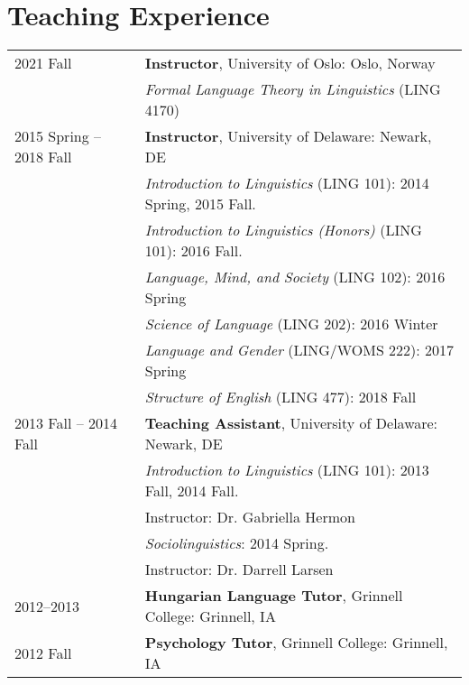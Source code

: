 \documentclass[11pt]{article} %
\begin{document}
\section*{Teaching Experience}
\begin{longtable}{p{1.6in} p{5.3in}}
	2021 Fall & \textbf{Instructor}, University of Oslo: Oslo, Norway \\
	& \textit{Formal Language Theory in Linguistics} (LING 4170)\\
	2015 Spring -- 2018 Fall & \textbf{Instructor}, University of Delaware: Newark, DE \\  
	& \textit{Introduction to Linguistics} (LING 101): 2014 Spring, 2015 Fall. 
	\\ 
	& \textit{Introduction to Linguistics (Honors)} (LING 101): 2016 Fall.\\
	& \textit{Language, Mind, and Society} (LING 102): 2016 Spring \\
	& \textit{Science of Language} (LING 202): 2016 Winter \\ 
	& \textit{Language and Gender} (LING/WOMS 222): 2017 Spring \\
	& \textit{Structure of English} (LING 477): 2018 Fall \\
	[5pt]
	2013 Fall -- 2014 Fall & \textbf{Teaching Assistant}, University of Delaware: Newark, DE \\ 
	& \textit{Introduction to Linguistics} (LING 101): 2013 Fall, 2014 Fall. \\
	& \hspace{0.2in} Instructor: Dr. Gabriella Hermon \\
	& \textit{Sociolinguistics}: 2014 Spring.\\
	& \hspace{0.2in} Instructor: Dr. Darrell Larsen \\
	[5pt]
	2012--2013 & \textbf{Hungarian Language Tutor}, Grinnell College: Grinnell, IA \\[5pt]
	2012 Fall & \textbf{Psychology Tutor}, Grinnell College: Grinnell, IA \\
	
\end{longtable}


\end{document}
